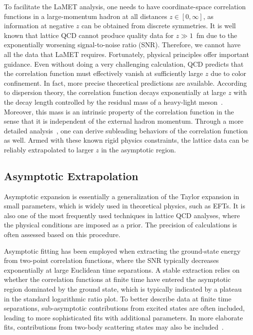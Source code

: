 \documentclass[prd,twocolumn,superscriptaddress,preprintnumbers,showpacs,nofootinbib,notitlepage,floatfix]{revtex4-2}
\begin{document}
To facilitate the LaMET analysis, one needs
to have coordinate-space correlation functions in a large-momentum hadron at all distances $z\in [0,\infty]$, as information at negative $z$ can be obtained from discrete symmetries. It is well known that lattice QCD cannot produce quality data for $z\gg 1$~fm due to the exponentially worsening signal-to-noise ratio (SNR). Therefore, we cannot have all the data that LaMET requires. Fortunately, physical principles offer important guidance. Even without doing 
a very challenging calculation, QCD predicts that the correlation function must effectively vanish at sufficiently large $z$ due to color confinement. In fact, more precise theoretical predictions are available. According to dispersion theory, the correlation function decays exponentially at large $z$ with the decay length controlled by the residual mass of a heavy-light meson~\cite{Gao:2021dbh}. Moreover, this mass is an intrinsic property of the correlation function in the sense that it is independent of the external hadron momentum. Through a more detailed analysis~\cite{Ji:2026vir}, one can derive subleading behaviors of the correlation function as well. Armed with these known rigid physics constraints, the lattice data can be reliably extrapolated to larger $z$ in the asymptotic region.

\subsection{Asymptotic Extrapolation}

Asymptotic expansion is essentially a generalization of the Taylor expansion in small parameters, which is widely used in theoretical physics, such as EFTs. It is also one of the most frequently used techniques in lattice QCD analyses, where the physical conditions are imposed as a prior. The precision of calculations is often assessed based on this procedure.

Asymptotic fitting has been employed when extracting the ground-state energy from two-point correlation functions, where the SNR typically decreases exponentially at large Euclidean time separations. A stable extraction relies on whether the correlation functions at finite time have entered the asymptotic region dominated by the ground state, which is typically indicated by a plateau in the standard logarithmic ratio plot. To better describe data at finite time separations, sub-asymptotic contributions from excited states are often included, leading to more sophisticated fits with additional parameters. In more elaborate fits, contributions from two-body scattering states may also be included~\cite{Mondal:2020cmt,Mondal:2020ela,Mondal:2021oot}.
\end{document}

